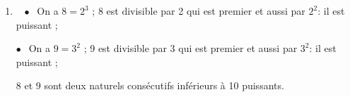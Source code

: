 \documentclass[10pt]{article}
\begin{document}
\medskip

\begin{enumerate}
\item ~%
$\bullet~~$ On a $8 = 2^3$ ; 8 est divisible par 2 qui est premier et aussi par $2^2$: il est puissant ;

$\bullet~~$ On a $9 = 3^2$ ; 9 est divisible par 3 qui est premier et aussi par $3^2$: il est puissant ;

8 et 9 sont deux naturels consécutifs inférieurs à 10  puissants.
\end{enumerate}
\medskip


\medskip
\end{document}
